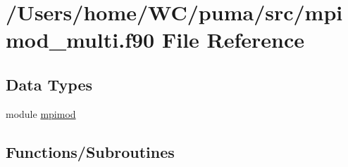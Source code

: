 \hypertarget{mpimod__multi_8f90}{
\section{/\-Users/home/\-W\-C/puma/src/mpimod\-\_\-multi.f90 \-File \-Reference}
\label{mpimod__multi_8f90}
}
\subsection*{\-Data \-Types}
\begin{DoxyCompactItemize}
\item 
module \hyperlink{classmpimod}{mpimod}
\end{DoxyCompactItemize}
\subsection*{\-Functions/\-Subroutines}
